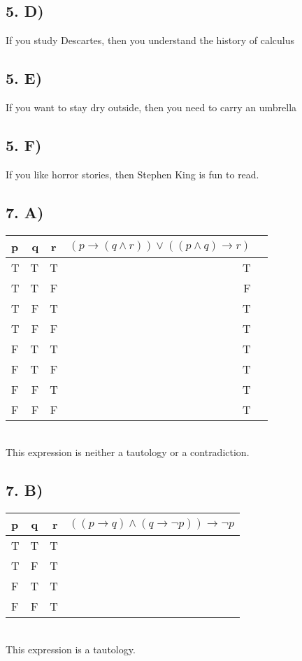 \documentclass[12]{scrartcl}
\begin{document}
\subsection*{5. D)}
If you study Descartes, then you understand the history of calculus
\subsection*{5. E)}
If you want to stay dry outside, then you need to carry an umbrella
\subsection*{5. F)}
If you like horror stories, then Stephen King is fun to read. 

\subsection*{7. A)}
\begin{tabular}{ l | r | c || r || r ||}
p & q & r & $ (p \rightarrow (q \wedge r)) \vee (( p \wedge q) \rightarrow r)$ \\
  \hline                        
  T & T & T & T\\
  T & T & F & F\\
  T & F & T & T\\
  T & F & F & T\\
  F & T & T & T\\
  F & T & F & T\\
  F & F & T & T\\
  F & F & F & T\\
  \hline  
\end{tabular} \\
This expression is neither a tautology or a contradiction. 
\subsection*{7. B)}
\begin{tabular}{ l | c || r || r ||}
p & q & r & $ ((p \rightarrow q) \wedge (q \rightarrow  \neg p )) \rightarrow \neg p$ \\
  \hline                        
  T & T & T\\
  T & F & T\\
  F & T & T\\
  F & F & T\\
  \hline  
\end{tabular} \\
This expression is a tautology. 
\end{document}
